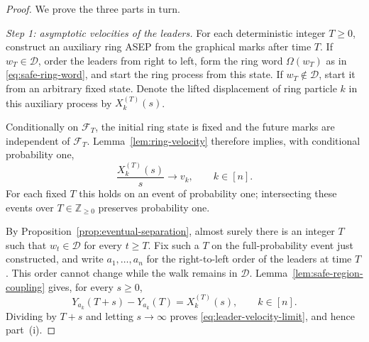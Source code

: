 \documentclass[10pt,a4paper]{amsart}
\newcommand{\Z}{\mathbb Z}
\newcommand{\cD}{\mathcal D}
\newcommand{\cF}{\mathcal F}
\begin{document}
	\begin{proof}
		We prove the three parts in turn.
		
		\medskip
		\noindent\emph{Step 1: asymptotic velocities of the leaders.}
		For each deterministic integer $T\ge0$, construct an auxiliary ring ASEP
		from the graphical marks after time $T$.  If $w_T\in\cD$, order the leaders
		from right to left, form the ring word $\Omega(w_T)$ as in
		\eqref{eq:safe-ring-word}, and start the ring process from this state.  If
		$w_T\notin\cD$, start it from an arbitrary fixed state.  Denote the lifted
		displacement of ring particle $k$ in this auxiliary process by
		$X_k^{(T)}(s)$.
		
		Conditionally on $\cF_T$, the initial ring state is fixed and the future
		marks are independent of $\cF_T$.  Lemma~\ref{lem:ring-velocity} therefore
		implies, with conditional probability one,
		\[
		\frac{X_k^{(T)}(s)}s\longrightarrow v_k,
		\qquad k\in[n].
		\]
		For each fixed $T$ this holds on an event of probability one; intersecting
		these events over $T\in\Z_{\ge0}$ preserves probability one.
		
		By Proposition~\ref{prop:eventual-separation}, almost surely there is an
		integer $T$ such that $w_t\in\cD$ for every $t\ge T$.  Fix such a $T$ on the
		full-probability event just constructed, and write $a_1,\ldots,a_n$ for the
		right-to-left order of the leaders at time $T$.  This order cannot change
		while the walk remains in $\cD$.  Lemma~\ref{lem:safe-region-coupling}
		gives, for every $s\ge0$,
		\begin{equation}\label{eq:theorem-safe-coupling}
			Y_{a_k}(T+s)-Y_{a_k}(T)=X_k^{(T)}(s),
			\qquad k\in[n].
		\end{equation}
		Dividing by $T+s$ and letting $s\to\infty$ proves
		\eqref{eq:leader-velocity-limit}, and hence part~(i).
		

\end{proof}
\end{document}
